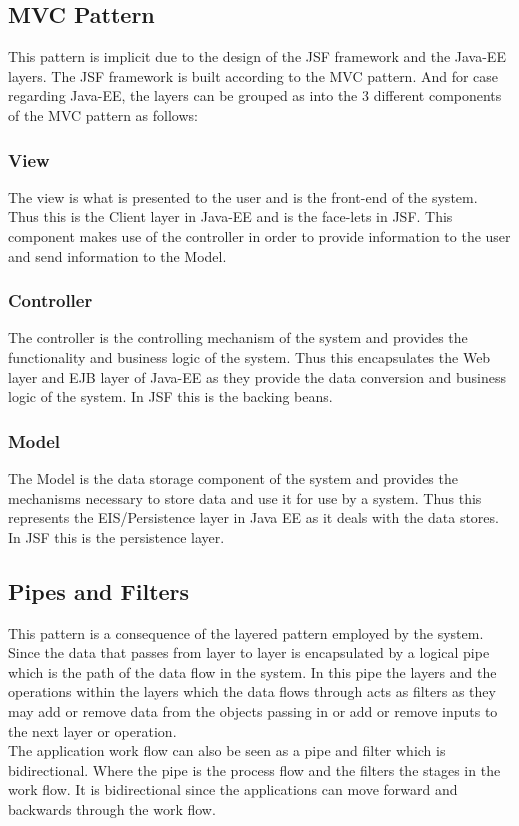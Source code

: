 \documentclass[12pt]{article}
\begin{document}
\subsection{MVC Pattern}
This pattern is implicit due to the design of the JSF framework and the Java-EE layers. The JSF framework is built according to the MVC pattern. And for case regarding Java-EE, the layers can be grouped as into the 3 different components of the MVC pattern as follows:

\subsubsection{View}
The view is what is presented to the user and is the front-end of the system. Thus this is the Client layer in Java-EE and is the face-lets in JSF. This component makes use of the controller in order to provide information to the user and send information to the Model.

\subsubsection{Controller}
The controller is the controlling mechanism of the system and provides the functionality and business logic of the system. Thus this encapsulates the Web layer and EJB layer of Java-EE as they provide the data conversion and business logic of the system. In JSF this is the backing beans.

\subsubsection{Model}
The Model is the data storage component of the system and provides the mechanisms necessary to store data and use it for use by a system. Thus this represents the EIS/Persistence layer in Java EE as it deals with the data stores. In JSF this is the persistence layer.

\subsection{Pipes and Filters}
This pattern is a consequence of the layered pattern employed by the system. Since the data that passes from layer to layer is encapsulated by a logical pipe which is the path of the data flow in the system. In this pipe the layers and the operations within the layers which the data flows through acts as filters as they may add or remove data from the objects passing in or add or remove inputs to the next layer or operation.\\
The application work flow can also be  seen as a pipe and filter which is bidirectional. Where the pipe is the process flow and the filters the stages in the work flow. It is bidirectional since the applications can move forward and backwards through the work flow.  
\end{document}
